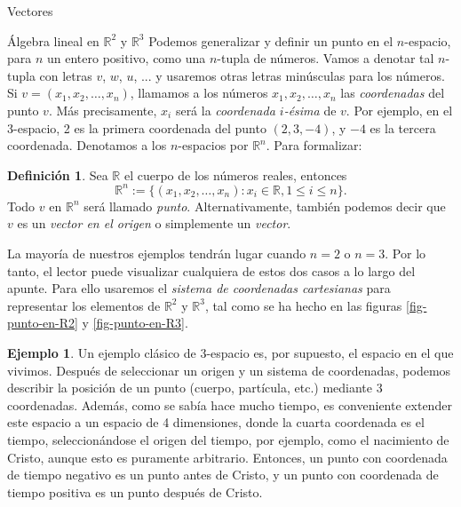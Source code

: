 \documentclass[a4paper,12pt,twoside,spanish,reqno]{amsbook}
\theoremstyle{definition}
\newtheorem{definicion}{Definici\'on}[section]
\newtheorem{ejemplo}{Ejemplo}[section]
\theoremstyle{remark}
\newcommand{\R}{\mathbb R}
\begin{document}
\begin{chapter}{Vectores}
\begin{section}{Álgebra lineal en $\R^2$ y $\R^3$}
        Podemos generalizar y definir un punto en el $n$-espacio, para $n$ un entero positivo, como una $n$-tupla de números. Vamos a denotar tal $n$-tupla con letras $v$, $w$, $u$, ... y usaremos otras letras minúsculas para los números. Si $v =(x_1,x_2,\ldots,x_n)$, llamamos a los números $x_1,x_2,\ldots,x_n$ las \textit{coordenadas} del punto $v$. Más precisamente, $x_i$ será la \textit{coordenada $i$-ésima} de $v$. Por ejemplo, en el 3-espacio, 2 es la primera coordenada del punto $(2,3, -4)$, y $-4$ es la tercera coordenada. Denotamos a los  $n$-espacios por $\R^n$. Para formalizar:
        \begin{definicion}
            Sea $\R$ el cuerpo de los números reales,  entonces
            \begin{equation*}
                \R^n:= \{(x_1,x_2,\ldots,x_n): x_i \in \R, 1 \le i \le n \}.
            \end{equation*}
            Todo $v$ en $\R^n$ será llamado {\em punto}. Alternativamente, también podemos decir que $v$  es un \textit{vector en el origen} o simplemente un \textit{vector}. 

        \end{definicion}
        
        La mayoría de nuestros ejemplos tendrán lugar cuando $n = 2$ o $n = 3$. Por lo tanto, el lector puede visualizar cualquiera de estos dos casos a lo largo del apunte. Para ello usaremos el {\em sistema  de coordenadas cartesianas} para representar los elementos de  $\R^2$ y  $\R^3$, tal como se ha hecho en las figuras \ref{fig-punto-en-R2} y \ref{fig-punto-en-R3}.
        
    
    
        \begin{ejemplo} \label{ej-3espacio-industria}
            Un ejemplo clásico de 3-espacio es, por supuesto, el espacio en el que vivimos. Después de seleccionar un origen y un sistema de coordenadas, podemos describir la posición de un punto (cuerpo, partícula, etc.) mediante 3 coordenadas. Además, como se sabía hace mucho tiempo, es conveniente extender este espacio a un espacio de 4 dimensiones, donde la cuarta coordenada es el tiempo, seleccionándose el origen del tiempo, por ejemplo, como el nacimiento de Cristo, aunque esto es puramente arbitrario. Entonces, un punto con coordenada de tiempo negativo es un punto antes de Cristo, y un punto con coordenada  de tiempo positiva es un punto después de Cristo.
            

\end{ejemplo}
\end{section}
\end{chapter}
\end{document}

